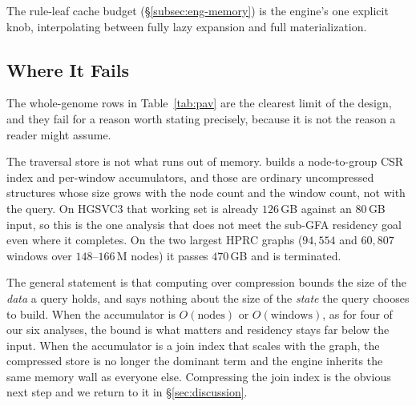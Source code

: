 The rule-leaf cache budget (\S\ref{subsec:eng-memory}) is the engine's one
explicit knob, interpolating between fully lazy expansion and full
materialization.


\subsection{Where It Fails}
\label{subsec:eval-limits}

The whole-genome  rows in Table~\ref{tab:pav} are the clearest limit of
the design, and they fail for a reason worth stating precisely, because it is not
the reason a reader might assume.

The traversal store is not what runs out of memory.  builds a node-to-group
CSR index and per-window accumulators, and those are ordinary uncompressed
structures whose size grows with the node count and the window count, not with the
query. On HGSVC3 that working set is already $126$\,GB against an $80$\,GB input,
so this is the one analysis that does not meet the sub-GFA residency goal even
where it completes. On the two largest HPRC graphs ($94{,}554$ and $60{,}807$
windows over $148$--$166$\,M nodes) it passes $470$\,GB and is terminated.

The general statement is that computing over compression bounds the size of the
\emph{data} a query holds, and says nothing about the size of the \emph{state} the
query chooses to build. When the accumulator is $O(\text{nodes})$ or
$O(\text{windows})$, as for four of our six analyses, the bound is what matters
and residency stays far below the input. When the accumulator is a join index that
scales with the graph, the compressed store is no longer the dominant term and the
engine inherits the same memory wall as everyone else. Compressing the join index
is the obvious next step and we return to it in \S\ref{sec:discussion}.
